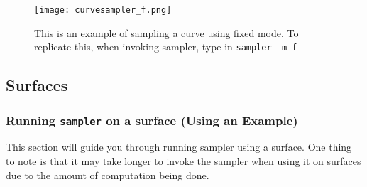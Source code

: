 \begin{figure}[H]
\centering
\texttt{[image: curvesampler\_f.png]}
\caption{This is an example of sampling a curve using fixed mode. To replicate this, when invoking sampler, type in {\tt sampler -m f}}
\end{figure}

\subsection{Surfaces}
\label{sec:sampler_surface}

\subsubsection{Running {\tt sampler} on a surface (Using an Example)}

This section will guide you through running sampler using a surface. One thing to note is that it may take longer to invoke the sampler when using it on surfaces due to the amount of computation being done.

